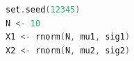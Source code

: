 \begin{lstlisting}[language=c++,label={code:20_03},caption={仮想データの生成}]
set.seed(12345)
N <- 10
X1 <- rnorm(N, mu1, sig1)
X2 <- rnorm(N, mu2, sig2)
\end{lstlisting}
